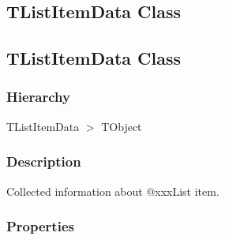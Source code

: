 \documentclass{report}
\begin{document}
\subsection*{\large{\textbf{TListItemData Class}}\normalsize\hspace{1ex}\hrulefill}
\else
\subsection*{TListItemData Class}
\fi
\label{PasDoc_Gen.TListItemData}
\subsubsection*{\large{\textbf{Hierarchy}}\normalsize\hspace{1ex}\hfill}
TListItemData {$>$} TObject
\subsubsection*{\large{\textbf{Description}}\normalsize\hspace{1ex}\hfill}
Collected information about @xxxList item.\subsubsection*{\large{\textbf{Properties}}\normalsize\hspace{1ex}\hfill}
\end{document}
